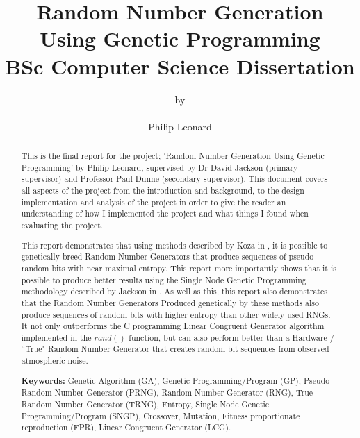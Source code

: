 \documentclass[a4paper,10.5pt]{article}
\title{Random Number Generation Using Genetic Programming\\ {\large BSc Computer Science Dissertation}}
\author{{\small by}\\\\Philip Leonard}
\begin{document}
\maketitle

\begin{abstract}
This is the final report for the project; `Random Number Generation Using Genetic Programming' by Philip Leonard, supervised by Dr David Jackson (primary supervisor) and Professor Paul Dunne (secondary supervisor). This document covers all aspects of the project from the introduction and background, to the design implementation and analysis of the project in order to give the reader an understanding of how I implemented the project and what things I found when evaluating the project.

This report demonstrates that using methods described by Koza in \cite{kozarng}, it is possible to genetically breed Random Number Generators that produce sequences of pseudo random bits with near maximal entropy. This report more importantly shows that it is possible to produce better results using the Single Node Genetic Programming methodology described by Jackson in \cite{jacksonsngp}. As well as this, this report also demonstrates that the Random Number Generators Produced genetically by these methods also produce sequences of random bits with higher entropy than other widely used RNGs. It not only outperforms the C programming Linear Congruent Generator algorithm implemented in the $rand()$ function, but can also perform better than a Hardware / ``True" Random Number Generator that creates random bit sequences from observed atmospheric noise.\newline

\noindent \textbf{Keywords:} Genetic Algorithm (GA), Genetic Programming/Program (GP), Pseudo Random Number Generator (PRNG), Random Number Generator (RNG), True Random Number Generator (TRNG), Entropy, Single Node Genetic Programming/Program (SNGP), Crossover, Mutation, Fitness proportionate reproduction (FPR), Linear Congruent Generator (LCG).
\end{abstract}

\newpage

\tableofcontents
\newpage
\end{document}
